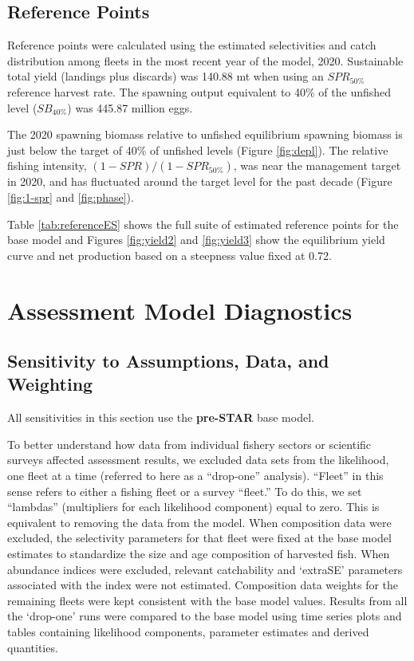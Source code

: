 \documentclass[
  english,
  a4paper,
]{article}
\begin{document}
\hypertarget{reference-points-1}{%
\subsection{Reference Points}\label{reference-points-1}}

Reference points were calculated using the estimated selectivities and catch distribution among fleets in the most recent year of the model, 2020.
Sustainable total yield (landings plus discards) was
140.88 mt when using an \(SPR_{50\%}\)
reference harvest rate. The spawning output equivalent to 40\% of the unfished level (\(SB_{40\%}\)) was 445.87
million eggs.

The 2020 spawning biomass relative to unfished equilibrium spawning biomass is just below the target of 40\% of unfished levels (Figure \ref{fig:depl}).
The relative fishing intensity, \((1-SPR)/(1-SPR_{50\%})\), was near the management target in 2020, and has fluctuated around the target level for the past decade (Figure \ref{fig:1-spr} and \ref{fig:phase}).

Table \ref{tab:referenceES} shows the full suite of estimated reference points for the base model and Figures \ref{fig:yield2} and \ref{fig:yield3} show the equilibrium yield curve and net production based on a steepness value fixed at 0.72.

\hypertarget{assessment-model-diagnostics}{%
\section{Assessment Model Diagnostics}\label{assessment-model-diagnostics}}

\hypertarget{sensitivity-to-assumptions-data-and-weighting}{%
\subsection{Sensitivity to Assumptions, Data, and Weighting}\label{sensitivity-to-assumptions-data-and-weighting}}

All sensitivities in this section use the \textbf{pre-STAR} base model.

To better understand how data from individual fishery sectors or scientific surveys affected assessment results, we excluded data sets from the likelihood, one fleet at a time (referred to here as a ``drop-one'' analysis). ``Fleet'' in this sense refers to either a fishing fleet or a survey ``fleet.'' To do this, we set ``lambdas'' (multipliers for each likelihood component) equal to zero. This is equivalent to removing the data from the model. When composition data were excluded, the selectivity parameters for that fleet were fixed at the base model estimates to standardize the size and age composition of harvested fish. When abundance indices were excluded, relevant catchability and `extraSE' parameters associated with the index were not estimated. Composition data weights for the remaining fleets were kept consistent with the base model values. Results from all the `drop-one' runs were compared to the base model using time series plots and tables containing likelihood components, parameter estimates and derived quantities.
\end{document}

